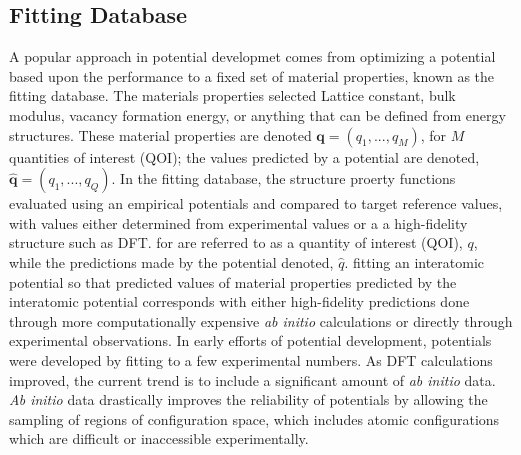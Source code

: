 \subsection{Fitting Database}
A popular approach in potential developmet comes from optimizing a potential based upon the performance to a fixed set of material properties, known as the fitting database.
The materials properties selected Lattice constant, bulk modulus, vacancy formation energy, or anything that can be defined from energy structures.
These material properties are denoted $\bm{q} = ( q_{1},...,q_{M} )$, for $M$ quantities of interest (QOI); the values predicted by a potential are denoted, $\hat{\bm{q}}= ( q_{1},...,q_{Q})$.
In the fitting database, the structure proerty functions evaluated using an empirical potentials and compared to target reference values, with values either determined from experimental values or a a high-fidelity structure such as DFT.
for are referred to as a quantity of interest (QOI), $q$, while the predictions made by the potential denoted, $\hat{q}$.
fitting an interatomic potential so that predicted values of material properties predicted by the interatomic potential corresponds with either high-fidelity predictions done through more computationally expensive \emph{ab initio} calculations or directly through experimental observations.
In early efforts of potential development, potentials were developed by fitting to a few experimental numbers.
As DFT calculations improved, the current trend is to include a significant amount of \emph{ab initio} data.  \emph{Ab initio} data drastically improves the reliability of potentials by allowing the sampling of regions of configuration space, which includes atomic configurations which are difficult or inaccessible experimentally.



